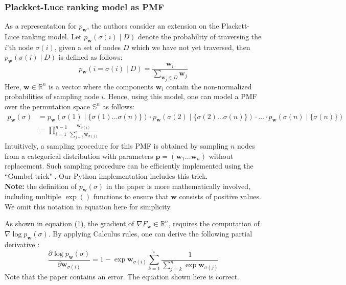 \documentclass[a4paper,10pt]{article}
\begin{document}
	\subsubsection{Plackket-Luce ranking model as PMF} \label{cha:pmf_indep}
	As a representation for $p_\mathbf{w}$, the authors consider an extension on the Plackett-Luce ranking model. Let $p_\mathbf{w}\left(\sigma(i) \mid D\right)$ denote the probability of traversing the $i$'th node $\sigma(i)$, given a set of nodes $D$ which we have not yet traversed, then $p_\mathbf{w}\left(\sigma(i) \mid D\right)$ is defined as follows:
	$$
		p_\mathbf{w}\left(i=\sigma(i) \mid D\right)=\frac{\mathbf{w}_i}{\sum_{\mathbf{w}_j \in D} \mathbf{w}_j}
	$$
	Here, $\mathbf{w} \in \mathbb{R}^n$ is a vector where the components $\mathbf{w}_i$ contain the non-normalized probabilities of sampling node $i$. Hence, using this model, one can model a PMF over the permutation space $\mathbb{S}^n$ as follows:	
	\begin{align}
		p_\mathbf{w}(\sigma) &= p_\mathbf{w}\left(\sigma(1) \mid \{ \sigma(1) \dots \sigma(n) \}\right) \cdot p_\mathbf{w}\left(\sigma(2) \mid \{ \sigma(2) \dots \sigma(n) \} \right) \cdot \ldots \cdot p_\mathbf{w}\left(\sigma(n) \mid \{ \sigma(n) \} \right) \\
		&=\prod_{i=1}^{n-1} \frac{\mathbf{w}_{\sigma(i)}}{\sum_{j=i}^n \mathbf{w}_{\sigma(j)}}
	\end{align}
	Intuitively, a sampling procedure for this PMF is obtained by sampling $n$ nodes from a categorical distribution with parameters $\mathbf{p} = (\mathbf{w}_1 \dots \mathbf{w}_n)$ without replacement. Such sampling procedure can be efficiently implemented using the ``Gumbel trick" \cite{kool_stochastic_2019}. Our Python implementation includes this trick. \\
	\textbf{Note:} the definition of $p_\mathbf{w}(\sigma)$ in the paper is more mathematically involved, including multiple $\exp()$ functions to ensure that $\mathbf{w}$ consists of positive values. We omit this notation in equation here for simplicity.

	As shown in equation (1), the gradient of $\nabla F_\mathbf{w} \in \mathbb{R}^n$, requires the computation of $\nabla \log p_\mathbf{w}(\sigma)$. By applying Calculus rules, one can derive the following partial derivative \citep{santucci_gradient_2020}:
	$$
	\frac{\partial \log p_\mathbf{w}(\sigma)}{\partial \mathbf{w}_{\sigma(i)}}=1-\exp \mathbf{w}_{\sigma(i)} \sum_{k=1}^i \frac{1}{\sum_{j=k}^n \exp \mathbf{w}_{\sigma(j)}}
	$$
	Note that the paper contains an error. The equation shown here is correct.
	
\end{document}
